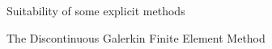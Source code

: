 \begin{frame}{Suitability of some explicit methods}
\begin{block}{The Discontinuous Galerkin Finite Element Method \cite{Cockburn}}
\begin{overprint}
\begin{columns}
\begin{column}{0.48\textwidth}
        \end{column}
      \end{columns}
      \vspace{-0.2cm}
    \end{overprint}
  \end{block}
\end{frame}



          
          

